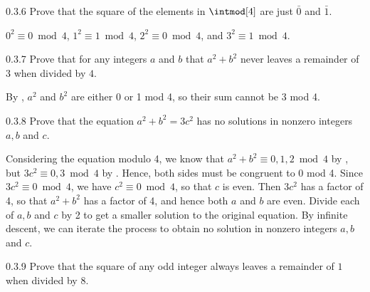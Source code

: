\begin{exercise}{0.3.6}
    Prove that the square of the elements in $\intmod[4]$ are just $\bar 0$ and $\bar 1$.
\end{exercise}

\begin{sol}
    $0^2 \equiv 0 \bmod 4$, $1^2 \equiv 1 \bmod 4$, $2^2 \equiv 0 \bmod 4$, and $3^2 \equiv 1 \bmod 4$.
\end{sol}

\begin{exercise}{0.3.7}
    Prove that for any integers $a$ and $b$ that $a^2 + b^2$ never leaves a remainder of $3$ when divided by $4$.

\end{exercise}

\begin{sol}
    By , $a^2$ and $b^2$ are either 0 or 1 mod 4, so their sum cannot be 3 mod 4.
\end{sol}

\begin{exercise}{0.3.8}
    Prove that the equation $a^2 + b^2 = 3c^2$ has no solutions in nonzero integers $a, b$ and $c$.
    
\end{exercise}

\begin{sol}
    Considering the equation modulo 4, we know that $a^2 + b^2 \equiv 0, 1, 2 \bmod 4$ by , but $3c^2 \equiv 0, 3 \bmod 4$ by .
    Hence, both sides must be congruent to 0 mod 4.
    Since $3c^2 \equiv 0 \bmod 4$, we have $c^2 \equiv 0 \bmod 4$, so that $c$ is even.
    Then $3c^2$ has a factor of 4, so that $a^2 + b^2$ has a factor of 4, and hence both $a$ and $b$ are even.
    Divide each of $a, b$ and $c$ by 2 to get a smaller solution to the original equation.
    By infinite descent, we can iterate the process to obtain no solution in nonzero integers $a, b$ and $c$.
\end{sol}

\begin{exercise}{0.3.9}
    Prove that the square of any odd integer always leaves a remainder of $1$ when divided by $8$.
\end{exercise}

